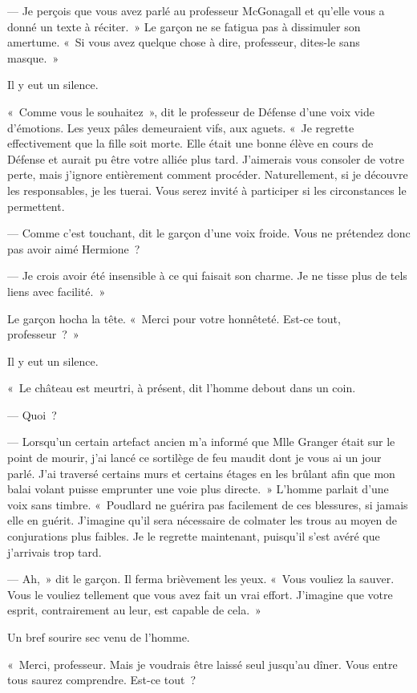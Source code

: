 --- Je perçois que vous avez parlé au professeur McGonagall et qu'elle vous a donné un texte à réciter.~»
Le garçon ne se fatigua pas à dissimuler son amertume.
«~Si vous avez quelque chose à dire, professeur, dites-le sans masque.~»

Il y eut un silence.

«~Comme vous le souhaitez~», dit le professeur de Défense d'une voix vide d'émotions.
Les yeux pâles demeuraient vifs, aux aguets.
«~Je regrette effectivement que la fille soit morte.
Elle était une bonne élève en cours de Défense et aurait pu être votre alliée plus tard.
J'aimerais vous consoler de votre perte, mais j'ignore entièrement comment procéder.
Naturellement, si je découvre les responsables, je les tuerai.
Vous serez invité à participer si les circonstances le permettent.

--- Comme c'est touchant, dit le garçon d'une voix froide.
Vous ne prétendez donc pas avoir aimé Hermione~?

--- Je crois avoir été insensible à ce qui faisait son charme.
Je ne tisse plus de tels liens avec facilité.~»

Le garçon hocha la tête.
«~Merci pour votre honnêteté.
Est-ce tout, professeur~?~»

Il y eut un silence.

«~Le château est meurtri, à présent, dit l'homme debout dans un coin.

--- Quoi~?

--- Lorsqu'un certain artefact ancien m'a informé que Mlle Granger était sur le point de mourir, j'ai lancé ce sortilège de feu maudit dont je vous ai un jour parlé.
J'ai traversé certains murs et certains étages en les brûlant afin que mon balai volant puisse emprunter une voie plus directe.~»
L'homme parlait d'une voix sans timbre.
«~Poudlard ne guérira pas facilement de ces blessures, si jamais elle en guérit.
J'imagine qu'il sera nécessaire de colmater les trous au moyen de conjurations plus faibles.
Je le regrette maintenant, puisqu'il s'est avéré que j'arrivais trop tard.

--- Ah,~» dit le garçon.
Il ferma brièvement les yeux.
«~Vous vouliez la sauver.
Vous le vouliez tellement que vous avez fait un vrai effort.
J'imagine que votre esprit, contrairement au leur, est capable de cela.~»

Un bref sourire sec venu de l'homme.

«~Merci, professeur.
Mais je voudrais être laissé seul jusqu'au dîner.
Vous entre tous saurez comprendre.
Est-ce tout~?


